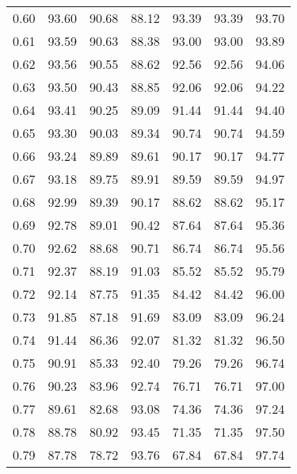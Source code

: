 \begin{tabular}{|c|c|c|c|c|c|c|}
      0.60 &     93.60 &     90.68 &      88.12 &   93.39 &      93.39 &         93.70 \\
      0.61 &     93.59 &     90.63 &      88.38 &   93.00 &      93.00 &         93.89 \\
      0.62 &     93.56 &     90.55 &      88.62 &   92.56 &      92.56 &         94.06 \\
      0.63 &     93.50 &     90.43 &      88.85 &   92.06 &      92.06 &         94.22 \\
      0.64 &     93.41 &     90.25 &      89.09 &   91.44 &      91.44 &         94.40 \\
      0.65 &     93.30 &     90.03 &      89.34 &   90.74 &      90.74 &         94.59 \\
      0.66 &     93.24 &     89.89 &      89.61 &   90.17 &      90.17 &         94.77 \\
      0.67 &     93.18 &     89.75 &      89.91 &   89.59 &      89.59 &         94.97 \\
      0.68 &     92.99 &     89.39 &      90.17 &   88.62 &      88.62 &         95.17 \\
      0.69 &     92.78 &     89.01 &      90.42 &   87.64 &      87.64 &         95.36 \\
      0.70 &     92.62 &     88.68 &      90.71 &   86.74 &      86.74 &         95.56 \\
      0.71 &     92.37 &     88.19 &      91.03 &   85.52 &      85.52 &         95.79 \\
      0.72 &     92.14 &     87.75 &      91.35 &   84.42 &      84.42 &         96.00 \\
      0.73 &     91.85 &     87.18 &      91.69 &   83.09 &      83.09 &         96.24 \\
      0.74 &     91.44 &     86.36 &      92.07 &   81.32 &      81.32 &         96.50 \\
      0.75 &     90.91 &     85.33 &      92.40 &   79.26 &      79.26 &         96.74 \\
      0.76 &     90.23 &     83.96 &      92.74 &   76.71 &      76.71 &         97.00 \\
      0.77 &     89.61 &     82.68 &      93.08 &   74.36 &      74.36 &         97.24 \\
      0.78 &     88.78 &     80.92 &      93.45 &   71.35 &      71.35 &         97.50 \\
      0.79 &     87.78 &     78.72 &      93.76 &   67.84 &      67.84 &         97.74 \\

\end{tabular}
